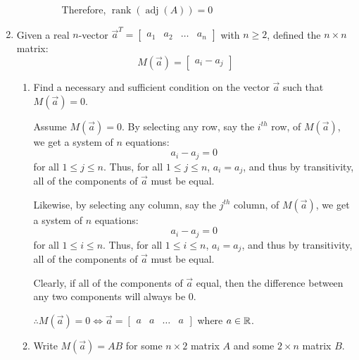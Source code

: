 \documentclass[letterpaper,12pt,fleqn]{article}
\DeclareMathOperator{\rnk}{rank}
\DeclareMathOperator{\adj}{adj}
\newcommand{\va}{\vec{a}}
\begin{document}
\begin{enumerate}
\begin{enumerate}
\begin{description}
      Therefore, $\rnk(\adj(A))=0$
    \end{description}
  \end{enumerate}

  \newpage

\item Given a real $n$-vector
  $\va^T=\begin{bmatrix} a_1 & a_2 & \ldots & a_n \end{bmatrix}$ with $n\ge 2$, defined
  the $n\times n$ matrix:
  \[M(\va)=\begin{bmatrix} a_i-a_j \end{bmatrix}\]
  \begin{enumerate}
  \item Find a necessary and sufficient condition on the vector $\va$ such that
    $M(\va)=0$.

    Assume $M(\va)=0$. By selecting any row, say the $i^{th}$ row, of $M(\va)$, we get
    a system of $n$ equations:
    \[a_i-a_j=0\]
    for all $1\le j\le n$. Thus, for all $1\le j\le n$, $a_i=a_j$, and thus by
    transitivity, all of the components of $\va$ must be equal.

    Likewise, by selecting any column, say the $j^{th}$ column, of $M(\va)$, we get
    a system of $n$ equations:
    \[a_i-a_j=0\]
    for all $1\le i\le n$. Thus, for all $1\le i\le n$, $a_i=a_j$, and thus by
    transitivity, all of the components of $\va$ must be equal.

    Clearly, if all of the components of $\va$ equal, then the difference between any two
    components will always be 0.

    $\therefore M(\va)=0 \iff \va=\begin{bmatrix} a & a & \ldots & a \end{bmatrix}$ where
    $a\in\mathbb{R}$.

  \item Write $M(\va)=AB$ for some $n\times2$ matrix $A$ and some $2\times n$ matrix
    $B$.

    \newcommand{\MA}{\begin{bmatrix}
        a_1 & 1 \\
        a_2 & 1 \\
        \vdots & \vdots \\
        a_n & 1
      \end{bmatrix}}
    \newcommand{\MB}{\begin{bmatrix}
        1 & 1 & \cdots & 1 \\
        -a_1 & -a_2 & \cdots & -a_n
      \end{bmatrix}}


\end{enumerate}
\end{enumerate}
\end{document}
